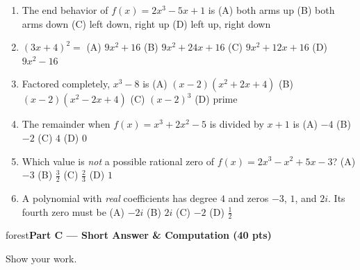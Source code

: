 \documentclass[10pt]{article}
\newcommand{\parthead}[1]{%
  \vspace{6pt}\noindent
  \begin{headlinebox}{forest}\color{white}\bfseries #1\end{headlinebox}%
  \vspace{4pt}}
\begin{document}
\begin{enumerate}[leftmargin=\dimexpr1.9em+0.4in+6pt\relax, itemsep=9pt]
  \item \leavevmode\llap{\choicebox{\gradedblank[id=qb1, type=choice, points=2, answer={C}]{0.4in}{10pt}}\hspace{\dimexpr\leftmargin-0.4in-2pt\relax}}The end behavior of $f(x)=2x^3-5x+1$ is
    \hfill (A) both arms up \quad (B) both arms down \quad (C) left down, right up \quad (D) left up, right down
  \item \leavevmode\llap{\choicebox{\gradedblank[id=qb2, type=choice, points=2, answer={B}]{0.4in}{10pt}}\hspace{\dimexpr\leftmargin-0.4in-2pt\relax}}$(3x+4)^2=$
    \hfill (A) $9x^2+16$ \quad (B) $9x^2+24x+16$ \quad (C) $9x^2+12x+16$ \quad (D) $9x^2-16$
  \item \leavevmode\llap{\choicebox{\gradedblank[id=qb3, type=choice, points=2, answer={A}]{0.4in}{10pt}}\hspace{\dimexpr\leftmargin-0.4in-2pt\relax}}Factored completely, $x^3-8$ is
    \hfill (A) $(x-2)(x^2+2x+4)$ \quad (B) $(x-2)(x^2-2x+4)$ \quad (C) $(x-2)^3$ \quad (D) prime
  \item \leavevmode\llap{\choicebox{\gradedblank[id=qb4, type=choice, points=2, answer={A}]{0.4in}{10pt}}\hspace{\dimexpr\leftmargin-0.4in-2pt\relax}}The remainder when $f(x)=x^3+2x^2-5$ is divided by $x+1$ is
    \hfill (A) $-4$ \quad (B) $-2$ \quad (C) $4$ \quad (D) $0$
  \item \leavevmode\llap{\choicebox{\gradedblank[id=qb5, type=choice, points=2, answer={C}]{0.4in}{10pt}}\hspace{\dimexpr\leftmargin-0.4in-2pt\relax}}Which value is \emph{not} a possible rational zero of $f(x)=2x^3-x^2+5x-3$?
    \hfill (A) $-3$ \quad (B) $\frac{3}{2}$ \quad (C) $\frac{2}{3}$ \quad (D) $1$
  \item \leavevmode\llap{\choicebox{\gradedblank[id=qb6, type=choice, points=2, answer={A}]{0.4in}{10pt}}\hspace{\dimexpr\leftmargin-0.4in-2pt\relax}}A polynomial with \emph{real} coefficients has degree $4$ and zeros $-3$, $1$, and $2i$. Its fourth zero must be
    \hfill (A) $-2i$ \quad (B) $2i$ \quad (C) $-2$ \quad (D) $\frac12$
\end{enumerate}

\parthead{Part C --- Short Answer \& Computation (40 pts)}
Show your work.
\end{document}
